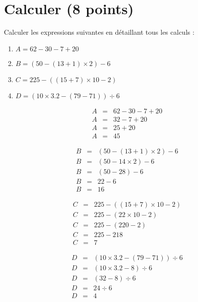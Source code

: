 \section{Calculer (8 points)}


\begin{questions}
	\question[4] Calculer les expressions suivantes en détaillant tous les calculs :
	
	\begin{enumerate}
		\item $A = 62 - 30 - 7 + 20$
		
		\item $B = (50 - (13 + 1) \times 2) - 6$
		
		\item $C= 225 - ((15 + 7) \times 10 - 2)$
		
		\item $D= (10 \times \num{3.2} - (79 - 71)) \div 6$
	\end{enumerate}


	\begin{solution}
		
		\begin{multicols}{2}
			
		\begin{eqnarray*}
			A &=& 62 - 30 - 7 + 20 \\
			A &=& 32 - 7 + 20 \\
			A &=& 25 + 20 \\
			A &=& 45
		\end{eqnarray*}
		
		\begin{eqnarray*}
			B &=& (50 - (13 + 1) \times 2) - 6 \\
			B &=& (50 - 14 \times 2) - 6  \\
			B &=& (50 - 28) - 6  \\
			B &=& 22 - 6  \\
			B &=& 16
		\end{eqnarray*}
		
		\begin{eqnarray*}
			C &=& 225 - ((15 + 7) \times 10 - 2)\\
			C &=& 225 - (22 \times 10 - 2) \\
			C &=& 225 - (220 - 2) \\
			C &=& 225 - 218  \\
			C &=& 7
		\end{eqnarray*}
		
		\begin{eqnarray*}
			D &=& (10 \times \num{3.2} - (79 - 71)) \div 6\\
			D &=& (10 \times \num{3.2} - 8) \div 6 \\
			D &=& (32 - 8) \div 6 \\
			D &=& 24 \div 6  \\
			D &=& 4
		\end{eqnarray*}
		\end{multicols}
	\end{solution}


\end{questions}
